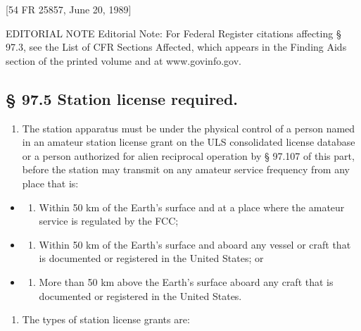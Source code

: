 \documentclass[
  letterpaper,
  DIV=11,
  numbers=noendperiod]{scrreport}
\providecommand{\tightlist}{%
  \setlength{\itemsep}{0pt}\setlength{\parskip}{0pt}}\usepackage{longtable,booktabs,array}
\begin{document}
{[}54 FR 25857, June 20, 1989{]}

EDITORIAL NOTE Editorial Note: For Federal Register citations affecting
§ 97.3, see the List of CFR Sections Affected, which appears in the
Finding Aids section of the printed volume and at www.govinfo.gov.

\hypertarget{97.5}{%
\subsection*{§ 97.5 Station license required.}\label{97.5}}

\begin{enumerate}
\def\labelenumi{(\alph{enumi})}
\tightlist
\item
  The station apparatus must be under the physical control of a person
  named in an amateur station license grant on the ULS consolidated
  license database or a person authorized for alien reciprocal operation
  by § 97.107 of this part, before the station may transmit on any
  amateur service frequency from any place that is:
\end{enumerate}

\begin{itemize}
\item
  \begin{enumerate}
  \def\labelenumi{(\arabic{enumi})}
  \tightlist
  \item
    Within 50 km of the Earth's surface and at a place where the amateur
    service is regulated by the FCC;
  \end{enumerate}
\item
  \begin{enumerate}
  \def\labelenumi{(\arabic{enumi})}
  \setcounter{enumi}{1}
  \tightlist
  \item
    Within 50 km of the Earth's surface and aboard any vessel or craft
    that is documented or registered in the United States; or
  \end{enumerate}
\item
  \begin{enumerate}
  \def\labelenumi{(\arabic{enumi})}
  \setcounter{enumi}{2}
  \tightlist
  \item
    More than 50 km above the Earth's surface aboard any craft that is
    documented or registered in the United States.
  \end{enumerate}
\end{itemize}

\begin{enumerate}
\def\labelenumi{(\alph{enumi})}
\setcounter{enumi}{1}
\tightlist
\item
  The types of station license grants are:
\end{enumerate}
\end{document}
